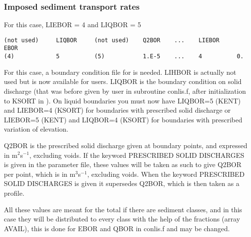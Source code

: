 \subsubsection{Imposed sediment transport rates}
For this case, {\ttfamily LIEBOR = 4} and  {\ttfamily LIQBOR = 5}
 \begin{verbatim}
(not used)     LIQBOR     (not used)    Q2BOR    ...    LIEBOR     EBOR
(4)            5          (5)           1.E-5    ...    4          0.         
\end{verbatim}
For this case, a boundary condition file for \sisyphe is needed. {\ttfamily LIHBOR} is actually not used but is now available for users. {\ttfamily LIQBOR} is the boundary condition on solid discharge (that was before given by user in subroutine {\ttfamily conlis.f}, after initialization to {\ttfamily KSORT} in \sisyphe). On liquid boundaries you must now have {\ttfamily LIQBOR=5 (KENT)} and {\ttfamily LIEBOR=4 (KSORT)} for boundaries with prescribed solid discharge or {\ttfamily LIEBOR=5 (KENT)} and {\ttfamily LIQBOR=4 (KSORT)} for boundaries with prescribed variation of elevation. 

{\ttfamily Q2BOR} is the prescribed solid discharge given at boundary points, and expressed in m$^2$s$^{-1}$, excluding voids. If the keyword {\ttfamily PRESCRIBED SOLID DISCHARGES} is given in the parameter file, these values will be taken as such to give {\ttfamily Q2BOR} per point, which is in m$^3$s$^{-1}$, excluding voids. When the keyword {\ttfamily PRESCRIBED SOLID DISCHARGES} is given it supersedes {\ttfamily Q2BOR}, which is then taken as a profile.

All these values are meant for the total if there are sediment classes, and in this case they will be distributed to every class with the help of the fractions (array {\ttfamily AVAIL}), this is done for {\ttfamily EBOR} and {\ttfamily QBOR} in {\ttfamily conlis.f} and may be changed.




